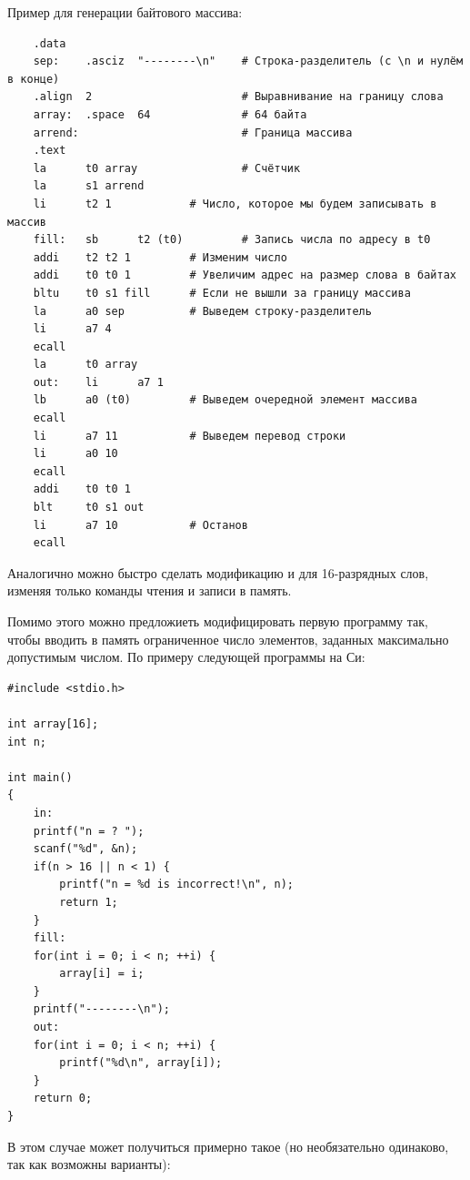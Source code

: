 Пример для генерации байтового массива:
\begin{verbatim}
    .data
    sep:    .asciz  "--------\n"    # Строка-разделитель (с \n и нулём в конце)
    .align  2                       # Выравнивание на границу слова
    array:  .space  64              # 64 байта
    arrend:                         # Граница массива
    .text
    la      t0 array                # Счётчик
    la      s1 arrend
    li      t2 1            # Число, которое мы будем записывать в массив
    fill:   sb      t2 (t0)         # Запись числа по адресу в t0
    addi    t2 t2 1         # Изменим число
    addi    t0 t0 1         # Увеличим адрес на размер слова в байтах
    bltu    t0 s1 fill      # Если не вышли за границу массива
    la      a0 sep          # Выведем строку-разделитель
    li      a7 4
    ecall
    la      t0 array
    out:    li      a7 1
    lb      a0 (t0)         # Выведем очередной элемент массива
    ecall
    li      a7 11           # Выведем перевод строки
    li      a0 10
    ecall
    addi    t0 t0 1
    blt     t0 s1 out
    li      a7 10           # Останов
    ecall
\end{verbatim}
Аналогично можно быстро сделать модификацию и для 16-разрядных слов, изменяя только команды чтения и записи в память.

Помимо этого можно предложиеть модифицировать первую программу так, чтобы вводить в память ограниченное число элементов, заданных максимально допустимым числом. По примеру следующей программы на Си:
\begin{verbatim}
#include <stdio.h>

int array[16];
int n;

int main()
{
    in:
    printf("n = ? ");
    scanf("%d", &n);
    if(n > 16 || n < 1) {
        printf("n = %d is incorrect!\n", n);
        return 1;
    }
    fill:
    for(int i = 0; i < n; ++i) {
        array[i] = i;
    }
    printf("--------\n");
    out:
    for(int i = 0; i < n; ++i) {
        printf("%d\n", array[i]);
    }
    return 0;
}
\end{verbatim}
В этом случае может получиться примерно такое (но необязательно одинаково, так как возможны варианты):

